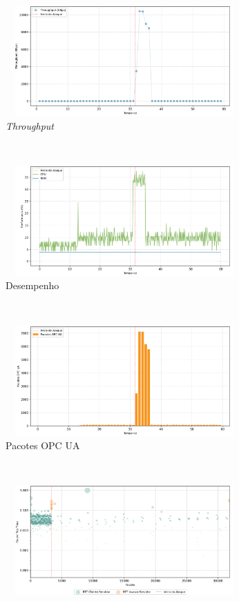 \begin{apendicesenv}
\begin{figure}[htbp!]
    \centering
    \begin{subfigure}[t]{0.5\textwidth}
        \centering
        \includegraphics[width=1\textwidth, height=120pt]{USPSC-img/output/cropped/2-dos_function_call_null_deref-tput.png}
        \caption{\textit{Throughput}}
    \end{subfigure}%
    ~ 
    \begin{subfigure}[t]{0.5\textwidth}
        \centering
        \includegraphics[width=1\textwidth, height=120pt]{USPSC-img/output/cropped/2-dos_function_call_null_deref-perf.png}
        \caption{Desempenho}
    \end{subfigure}%
    \\
    \begin{subfigure}[t]{0.5\textwidth}
        \centering
        \includegraphics[width=1\textwidth, height=120pt]{USPSC-img/output/cropped/2-dos_function_call_null_deref-pack.png}
        \caption{Pacotes OPC UA}
    \end{subfigure}%
    ~
    \begin{subfigure}[t]{0.5\textwidth}
        \centering
        \includegraphics[width=1\textwidth, height=120pt]{USPSC-img/output/cropped/2-dos_function_call_null_deref-rttp.png}

\end{subfigure}
\end{figure}
\end{apendicesenv}
